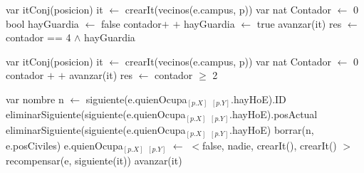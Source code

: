 \begin{algorithm}[H]
\begin{algorithmic}[1]
 
    \State var itConj(posicion) it $\gets$ crearIt(vecinos(e.campus, p))         	\State var nat Contador $\gets$ 0 
    \State bool hayGuardia $\gets$ false 
		 
			\State contador$+$ $+$ 
		\EndIf
		 
   			\State  hayGuardia $\gets$ true 
   		\EndIF
   		\State avanzar(it)
   	\EndWhile
   	\State res $\gets$ contador == 4 $\wedge$ hayGuardia
\EndFunction
\end{algorithmic}
\end{algorithm}

\begin{algorithm}[H]
\begin{algorithmic}[1]
 
    \State var itConj(posicion) it $\gets$ crearIt(vecinos(e.campus, p))         	\State var nat Contador $\gets$ 0 
     
    	 
    		\State contador $+$ $+$ 
    	\EndIf
    	\State avanzar(it)
     \EndWhile
    \State res $\gets$ contador $\geqslant$ 2 
\EndFunction
\end{algorithmic}
\end{algorithm}

\begin{algorithm}[H]
\begin{algorithmic}[1]
 
    \State var nombre n $\gets$ siguiente(e.quienOcupa$_{[p.X]}$ $_{[p.Y]}$.hayHoE).ID 
    \State eliminarSiguiente(siguiente(e.quienOcupa$_{[p.X]}$ $_{[p.Y]}$.hayHoE).posActual 
    \State eliminarSiguiente(siguiente(e.quienOcupa$_{[p.X]}$ $_{[p.Y]}$.hayHoE) 
    \State borrar(n, e.posCiviles) 
	\State e.quienOcupa$_{[p.X]}$ $_{[p.Y]}$ $\gets$ $<$false, nadie, crearIt(), crearIt() $>$ 
	  
    	 
    		\State recompensar(e, siguiente(it)) 
    	\EndIf
    	\State avanzar(it)
     \EndWhile
\EndFunction
\end{algorithmic}
\end{algorithm}


